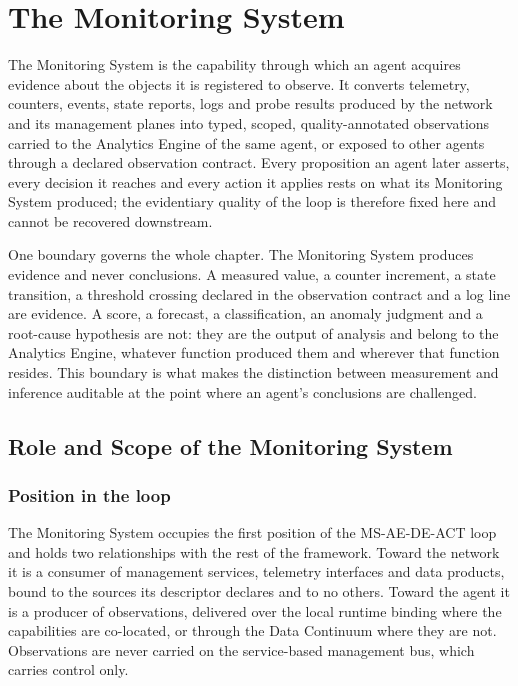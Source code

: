 
\hypertarget{the-monitoring-system}{%
\section{The Monitoring System}\label{the-monitoring-system}}

The Monitoring System is the capability through which an agent acquires
evidence about the objects it is registered to observe. It converts
telemetry, counters, events, state reports, logs and probe results
produced by the network and its management planes into typed, scoped,
quality-annotated observations carried to the Analytics Engine of the
same agent, or exposed to other agents through a declared observation
contract. Every proposition an agent later asserts, every decision it
reaches and every action it applies rests on what its Monitoring System
produced; the evidentiary quality of the loop is therefore fixed here
and cannot be recovered downstream.

One boundary governs the whole chapter. The Monitoring System produces
evidence and never conclusions. A measured value, a counter increment, a
state transition, a threshold crossing declared in the observation
contract and a log line are evidence. A score, a forecast, a
classification, an anomaly judgment and a root-cause hypothesis are not:
they are the output of analysis and belong to the Analytics Engine,
whatever function produced them and wherever that function resides. This
boundary is what makes the distinction between measurement and inference
auditable at the point where an agent's conclusions are challenged.

\hypertarget{role-and-scope-of-the-monitoring-system}{%
\subsection{Role and Scope of the Monitoring System}\label{role-and-scope-of-the-monitoring-system}}

\hypertarget{position-in-the-loop}{%
\subsubsection{Position in the loop}\label{position-in-the-loop}}

The Monitoring System occupies the first position of the MS-AE-DE-ACT
loop and holds two relationships with the rest of the framework. Toward
the network it is a consumer of management services, telemetry
interfaces and data products, bound to the sources its descriptor
declares and to no others. Toward the agent it is a producer of
observations, delivered over the local runtime binding where the
capabilities are co-located, or through the Data Continuum where they
are not. Observations are never carried on the service-based management
bus, which carries control only.

